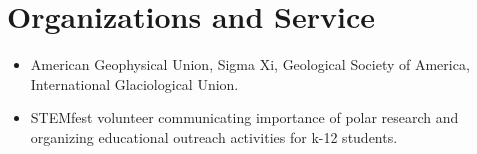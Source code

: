 \section{Organizations and Service}
\begin{itemize}
\item American Geophysical Union, Sigma Xi, Geological Society of America, International Glaciological Union.
\item STEMfest volunteer communicating importance of polar research and organizing educational outreach activities for k-12 students.
\end{itemize}

